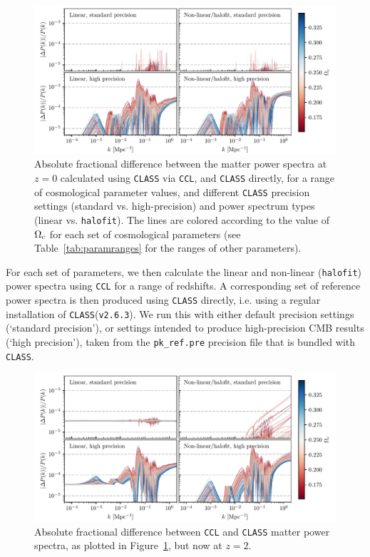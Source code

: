 \documentclass[\docopts]{\docclass}
\newcommand{\ccl}{{\tt CCL}\xspace}
\newcommand{\halofit}{{\tt halofit}\xspace}
\newcommand{\class}{{\tt CLASS}\xspace}
\begin{document}
\begin{figure}
\centering
\includegraphics[width=1\textwidth]{pkdev_v3_z0_00}
\caption{Absolute fractional difference between the matter power spectra at $z=0$ calculated using \class via \ccl, and \class directly, for a range of cosmological parameter values, and different \class precision settings (standard vs. high-precision) and power spectrum types (linear vs. \halofit). The lines are colored according to the value of $\Omega_{\rm c}$ for each set of cosmological parameters (see Table~\ref{tab:paramranges} for the ranges of other parameters). }
\label{fig:power_paramspace}
\end{figure}
%


For each set of parameters, we then calculate the linear and non-linear (\halofit) power spectra using \ccl for a range of redshifts. A corresponding set of reference power spectra is then produced using \class directly, i.e. using a regular installation of \class ({\tt v2.6.3}). We run this with either default precision settings (`standard precision'), or settings intended to produce high-precision CMB results (`high precision'), taken from the {\tt pk\_ref.pre} precision file that is bundled with \class.

\begin{figure}
\centering
\includegraphics[width=1\textwidth]{pkdev_v3_z2_00}
\caption{Absolute fractional difference between \ccl and \class matter power spectra, as plotted in Figure~\ref{fig:power_paramspace}, but now at $z=2$.}
\label{fig:power_paramspace_z2}
\end{figure}
\end{document}
